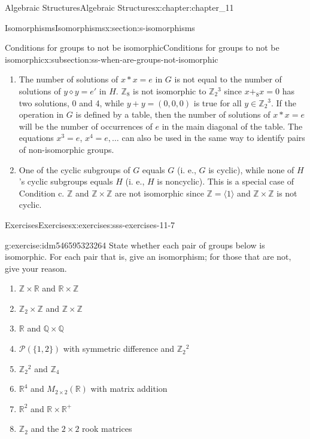 \documentclass[oneside,10pt,]{book}
\numberwithin{equation}{section}
\begin{document}
\begin{chapterptx}{Algebraic Structures}{}{Algebraic Structures}{}{}{x:chapter:chapter_11}
\begin{sectionptx}{Isomorphisms}{}{Isomorphisms}{}{}{x:section:s-isomorphisms}
\begin{subsectionptx}{Conditions for groups to not be isomorphic}{}{Conditions for groups to not be isomorphic}{}{}{x:subsection:ss-when-are-groups-not-isomorphic}
\begin{enumerate}[label=(\alph*)]
\item{}The number of solutions of \(x * x = e\) in \(G\) is not equal to the number of solutions of \(y \diamond  y = e'\) in \(H\). \(\mathbb{Z}_8\) is not isomorphic to \(\mathbb{Z}_2{}^3\) since \(x +_8 x = 0\) has two solutions, 0 and 4, while \(y + y = (0, 0, 0)\) is true for all \(y\in \mathbb{Z}_2{}^3\). If the operation in \(G\) is defined by a table, then the number of solutions of \(x * x = e\) will be the number of occurrences of \(e\) in the main diagonal of the table. The equations \(x^3 = e\), \(x^4= e, \dots\)  can also be used in the same way to identify pairs of non-isomorphic groups.%
\item{}One of the cyclic subgroups of \(G\) equals \(G\) (i. e., \(G\) is cyclic), while none of \(H\)'s cyclic subgroups equals \(H\) (i. e., \(H\) is noncyclic). This is a special case of Condition c. \(\mathbb{Z}\) and \(\mathbb{Z} \times  \mathbb{Z}\) are not isomorphic since \(\mathbb{Z} = \langle 1\rangle\) and \(\mathbb{Z} \times  \mathbb{Z}\) is not cyclic.%
\end{enumerate}
%
\end{subsectionptx}
%
%
\typeout{************************************************}
\typeout{************************************************}
%
\begin{exercises-subsection}{Exercises}{}{Exercises}{}{}{x:exercises:sss-exercises-11-7}
\begin{divisionexercise}{1}{}{}{g:exercise:idm546595323264}%
State whether each pair of groups below is isomorphic. For each pair that is, give an isomorphism; for those that are not, give your reason.%
\begin{enumerate}[label=(\alph*)]
\item{}\(\mathbb{Z} \times  \mathbb{R}\) and \(\mathbb{R} \times  \mathbb{Z}\)%
\item{}\(\mathbb{Z}_2\times \mathbb{Z}\)  and \(\mathbb{Z} \times  \mathbb{Z}\)%
\item{}\(\mathbb{R}\) and \(\mathbb{Q} \times  \mathbb{Q}\)%
\item{}\(\mathcal{P}(\{1, 2\})\) with symmetric difference and \(\mathbb{Z}_2{}^2\)%
\item{}\(\mathbb{Z}_2{}^2\) and \(\mathbb{Z}_4\)%
\item{}\(\mathbb{R}^4\) and \(M_{2\times 2}(\mathbb{R})\) with matrix addition%
\item{}\(\mathbb{R}^2\) and \(\mathbb{R} \times  \mathbb{R}^+\)%
\item{}\(\mathbb{Z}_2\) and the \(2 \times  2\) rook matrices%

\end{enumerate}
\end{divisionexercise}
\end{exercises-subsection}
\end{sectionptx}
\end{chapterptx}
\end{document}
